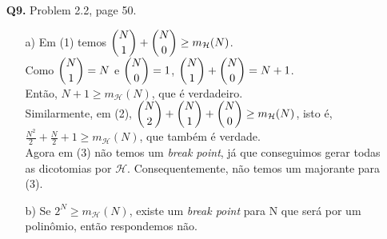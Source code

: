 \documentclass[12pt]{article}
\begin{document}
\begin{enumerate}
\pagebreak	

\item [\textbf{Q9.}] Problem 2.2, page 50.
	\begin{addmargin}[1em]{2em}
		\begin{itemize}
			\item[a)] Em (1) temos $\dbinom{N}{1} + \dbinom{N}{0} \geq m_{\mathcal{H}}(N)$.\\
			Como $\dbinom{N}{1} = N$ e $\dbinom{N}{0} = 1$, $\dbinom{N}{1} + \dbinom{N}{0} = N+1$.\\
			Então, $N + 1 \geq m_{\mathcal{H}}(N)$, que é verdadeiro.\\
			Similarmente, em (2), $\dbinom{N}{2} + \dbinom{N}{1} + \dbinom{N}{0} \geq m_{\mathcal{H}}(N)$, isto é,\\ 
			$\frac{N^2}{2} + \frac{N}{2} + 1 \geq m_{\mathcal{H}}(N)$, que também é verdade.\\
			Agora  em (3) não temos um \textit{break point}, já que conseguimos gerar todas as dicotomias por $\mathcal{H}$. Consequentemente,  não temos um majorante para (3).
			\item[b)] Se $2^N \geq m_{\mathcal{H}}(N)$, existe um \textit{break point} para N que será por um polinômio, então respondemos não.
		\end{itemize}
	\end{addmargin}
	

\end{enumerate}
\end{document}
